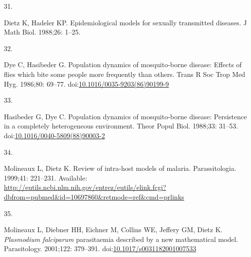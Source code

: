 \documentclass[
]{book}
\newlength{\cslhangindent}
\newlength{\csllabelwidth}
\newlength{\cslentryspacingunit} %
\newenvironment{CSLReferences}[2] %
 {%
  \setlength{\parindent}{0pt}
  \ifodd #1
  \let\oldpar\par
  \def\par{\hangindent=\cslhangindent\oldpar}
  \fi
  \setlength{\parskip}{#2\cslentryspacingunit}
 }%
 {}
\newcommand{\CSLLeftMargin}[1]{\parbox[t]{\csllabelwidth}{#1}}
\newcommand{\CSLRightInline}[1]{\parbox[t]{\linewidth - \csllabelwidth}{#1}\break}
\begin{document}
\begin{CSLReferences}{0}{0}
\leavevmode{}%
\CSLLeftMargin{31. }%
\CSLRightInline{Dietz K, Hadeler KP. Epidemiological models for sexually transmitted diseases. J Math Biol. 1988;26: 1--25. }

\leavevmode{}%
\CSLLeftMargin{32. }%
\CSLRightInline{Dye C, Hasibeder G. Population dynamics of mosquito-borne disease: Effects of flies which bite some people more frequently than others. Trans R Soc Trop Med Hyg. 1986;80: 69--77. doi:\href{https://doi.org/10.1016/0035-9203(86)90199-9}{10.1016/0035-9203(86)90199-9}}

\leavevmode{}%
\CSLLeftMargin{33. }%
\CSLRightInline{Hasibeder G, Dye C. Population dynamics of mosquito-borne disease: Persistence in a completely heterogeneous environment. Theor Popul Biol. 1988;33: 31--53. doi:\href{https://doi.org/10.1016/0040-5809(88)90003-2}{10.1016/0040-5809(88)90003-2}}

\leavevmode{}%
\CSLLeftMargin{34. }%
\CSLRightInline{Molineaux L, Dietz K. Review of intra-host models of malaria. Parassitologia. 1999;41: 221--231. Available: \url{http://eutils.ncbi.nlm.nih.gov/entrez/eutils/elink.fcgi?dbfrom=pubmed\&id=10697860\&retmode=ref\&cmd=prlinks}}

\leavevmode{}%
\CSLLeftMargin{35. }%
\CSLRightInline{Molineaux L, Diebner HH, Eichner M, Collins WE, Jeffery GM, Dietz K. \emph{Plasmodium falciparum} parasitaemia described by a new mathematical model. Parasitology. 2001;122: 379--391. doi:\href{https://doi.org/10.1017/s0031182001007533}{10.1017/s0031182001007533}}

\end{CSLReferences}
\end{document}
